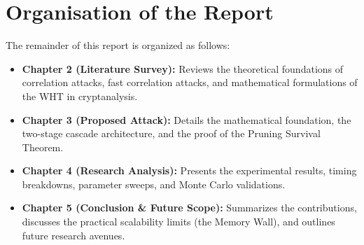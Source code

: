 \section{Organisation of the Report}
\label{sec:organisation}
The remainder of this report is organized as follows:
\begin{itemize}
    \item \textbf{Chapter 2 (Literature Survey):} Reviews the theoretical foundations of correlation attacks, fast correlation attacks, and mathematical formulations of the WHT in cryptanalysis.
    \item \textbf{Chapter 3 (Proposed Attack):} Details the mathematical foundation, the two-stage cascade architecture, and the proof of the Pruning Survival Theorem.
    \item \textbf{Chapter 4 (Research Analysis):} Presents the experimental results, timing breakdowns, parameter sweeps, and Monte Carlo validations.
    \item \textbf{Chapter 5 (Conclusion \& Future Scope):} Summarizes the contributions, discusses the practical scalability limits (the Memory Wall), and outlines future research avenues.
\end{itemize}
